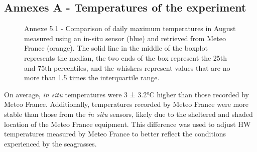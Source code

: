\documentclass[
  letterpaper,
  11pt,
  english,
  singlespacing,
  headsepline]{MastersDoctoralThesis}
\newcommand{\chaptertopimage}{Chapter1/img/seagrasses.png}
\newcommand{\chapterbottomimage}{Chapter1/img/seagrasses.png}
\begin{document}
\begin{spacing}{1.5}
\subsection{Annexes A - Temperatures of the
experiment}\label{sec-AnnexeA_h}

\begin{figure}


\caption{\label{fig-temperatureAnnexe}Annexe 5.1 - Comparison of daily
maximum temperatures in August measured using an in-situ sensor (blue)
and retrieved from Meteo France (orange). The solid line in the middle
of the boxplot represents the median, the two ends of the box represent
the 25th and 75th percentiles, and the whiskers represent values that
are no more than 1.5 times the interquartile range.}

\end{figure}%

On average, \emph{in situ} temperatures were 3 ± 3.2°C higher than those
recorded by Meteo France. Additionally, temperatures recorded by Meteo
France were more stable than those from the \emph{in situ} sensors,
likely due to the sheltered and shaded location of the Meteo France
equipment. This difference was used to adjust HW temperatures measured
by Meteo France to better reflect the conditions experienced by the
seagrasses.

\end{spacing}

\renewcommand{\chaptertopimage}{Chapter6/img/top.png}
\renewcommand{\chapterbottomimage}{Chapter6/img/bottom.png}
\end{document}

